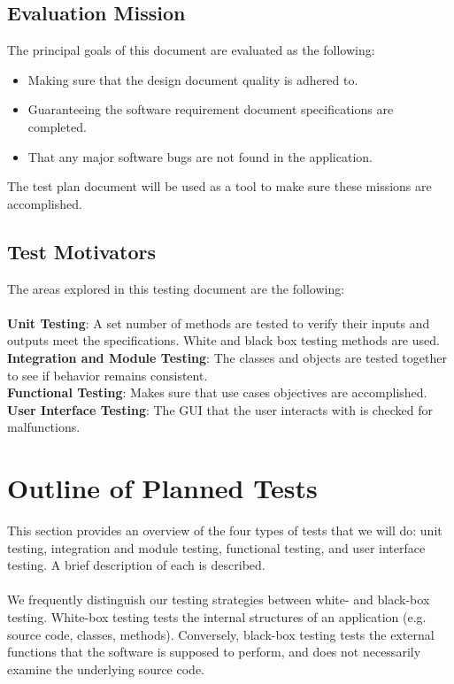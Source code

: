 \documentclass{scrreprt}
\begin{document}
    \section{Evaluation Mission}
    The principal goals of this document are evaluated as the following:
    \begin{itemize}
    \item Making sure that the design document quality is adhered to.
    \item Guaranteeing the software requirement document specifications are completed.
    \item That any major software bugs are not found in the application.
    \end{itemize}
    
    The test plan document will be used as a tool to make sure these missions are accomplished.
    
\newpage 

    \section{Test Motivators}
    The areas explored in this testing document are the following:
\\    \\
    \textbf{Unit Testing}: A set number of methods are tested to verify their inputs and outputs meet the specifications. White and black box testing methods are used.\\
    \textbf{Integration and Module Testing}: The classes and objects are tested together to see if behavior remains consistent. \\
    \textbf{Functional Testing}: Makes sure that use cases objectives are accomplished.
    \newline
    \textbf{User Interface Testing}: The GUI that the user interacts with is checked for malfunctions. 
    
    \chapter{Outline of Planned Tests}

    This section provides an overview of the four types of tests that we will do: unit testing, integration and module testing, functional testing, and user interface testing. A brief description of each is described. \\ \\
    We frequently distinguish our testing strategies between white- and black-box testing. White-box testing tests the internal structures of an application (e.g. source code, classes, methods). Conversely, black-box testing tests the external functions that the software is supposed to perform, and does not necessarily examine the underlying source code.
\end{document}

